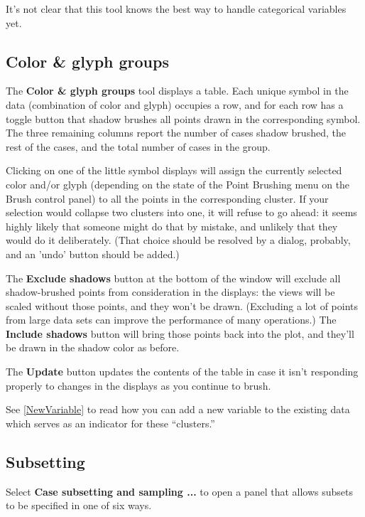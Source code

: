 \documentclass[11pt]{article}
\begin{document}
It's not clear that this tool knows the best way to handle categorical
variables yet.

\subsection{Color \& glyph groups}
\label{slbl:ColorAndGlyphGroups}

The {\bf Color \& glyph groups} tool displays a table.  Each unique
symbol in the data (combination of color and glyph) occupies a row,
and for each row has a toggle button that shadow brushes all points
drawn in the corresponding symbol.  The three remaining columns
report the number of cases shadow brushed, the rest of the cases, and
the total number of cases in the group.

Clicking on one of the little symbol displays will assign the
currently selected color and/or glyph (depending on the state of the
Point Brushing menu on the Brush control panel) to all the points in
the corresponding cluster.  If your selection would collapse two
clusters into one, it will refuse to go ahead:  it seems highly
likely that someone might do that by mistake, and unlikely that they
would do it deliberately.  (That choice should be resolved by a
dialog, probably, and an 'undo' button should be added.)

The {\bf Exclude shadows} button at the bottom of the window will
exclude all shadow-brushed points from consideration in the
displays:  the views will be scaled without those points, and they
won't be drawn.  (Excluding a lot of points from large data sets can
improve the performance of many operations.)
The {\bf Include shadows} button will bring those
points back into the plot, and they'll be drawn in the shadow color
as before.

The {\bf Update} button updates the contents of the table in case it
isn't responding properly to changes in the displays as you continue
to brush.


See \ref{NewVariable} to read how you can add a new variable to the
existing data which serves as an indicator for these ``clusters.''

\subsection{Subsetting}

Select {\bf Case subsetting and sampling ...} to open a panel
that allows subsets to be specified in one of six ways.
\end{document}
